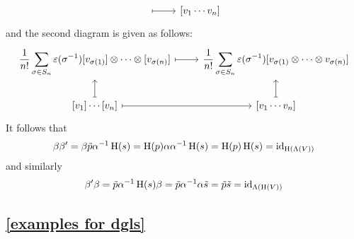 \begin{enumerate}
\[\begin{tikzcd}
        \arrow[mapsto]{r}
        &
        {[v_1 \dotsm v_n]}
      \end{tikzcd}
    \]
    and the second diagram is given as follows:
    \[
      \begin{tikzcd}
        \displaystyle
        \frac{1}{n!} \sum_{\sigma \in S_n} \varepsilon(\sigma^{-1})
        {[v_{\sigma(1)}]} \tensor \dotsb \tensor {[v_{\sigma(n)}]}
        \arrow[mapsto]{r}
        &
        \displaystyle
        \frac{1}{n!} \sum_{\sigma \in S_n} \varepsilon(\sigma^{-1})
        {[v_{\sigma(1)} \tensor \dotsb \tensor v_{\sigma(n)}]}
        \\
        {[v_1]} \dotsm {[v_n]}
        \arrow[mapsto]{u}
        \arrow[mapsto]{r}
        &
        {[v_1 \dotsm v_n]}
        \arrow[mapsto]{u}
      \end{tikzcd}
    \]
    It follows that
    \[
      \beta \beta'
      =
      \beta \tilde{p} \alpha^{-1} \operatorname{H}(s)
      =
      \operatorname{H}(p) \alpha \alpha^{-1} \operatorname{H}(s)
      =
      \operatorname{H}(p) \operatorname{H}(s)
      =
      \operatorname{id}_{\operatorname{H}(\operatorname{\Lambda}(V))}
    \]
    and similarly
    \[
      \beta' \beta
      =
      \tilde{p} \alpha^{-1} \operatorname{H}(s) \beta
      =
      \tilde{p} \alpha^{-1} \alpha \tilde{s}
      =
      \tilde{p} \tilde{s}
      =
      \operatorname{id}_{\operatorname{\Lambda}(\operatorname{H}(V))}
    \]
\end{enumerate}





\subsection{\cref{examples for dgls}}
\label{examples for dgls proof}

